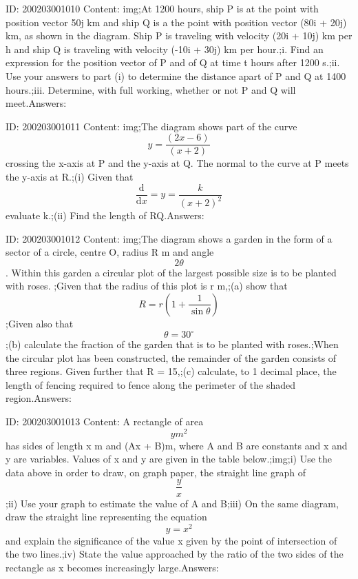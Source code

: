 \documentclass{article}
\begin{document}
ID: 200203001010
Content:
img;At 1200 hours, ship P is at the point with position vector 50j km and ship Q is a the point with position vector (80i + 20j) km, as shown in the diagram. Ship P is traveling with velocity (20i + 10j) km per h and ship Q is traveling with velocity (-10i + 30j) km per hour.;i.	Find an expression for the position vector of P and of Q at time t hours after 1200 s.;ii.	Use your answers to part (i) to determine the distance apart of P and Q at 1400 hours.;iii.	Determine, with full working, whether or not P and Q will meet.Answers:

ID: 200203001011
Content:
img;The diagram shows part of the curve $$ y=\frac{(2x-6)}{(x+2)}$$ crossing the x-axis at P and the y-axis at Q. The normal to the curve at P meets the y-axis at R.;(i)	Given that $$\frac{\mathrm{d} }{\mathrm{d} x}= y=\frac{k}{(x+2)^2}$$ evaluate k.;(ii)	Find the length of RQ.Answers:

ID: 200203001012
Content:
img;The diagram shows a garden in the form of a sector of a circle, centre O, radius R m and angle $$2 \theta$$. Within this garden a circular plot of the largest possible size is to be planted with roses. ;Given that the radius of this plot is r m,;(a)	show that $$R=r(1+ \frac{1}{\sin\theta})$$;Given also that $$\theta = 30^{\circ}$$;(b)	calculate the fraction of the garden that is to be planted with roses.;When the circular plot has been constructed, the remainder of the garden consists of three regions. Given further that R = 15,;(c)	calculate, to 1 decimal place, the length of fencing required to fence along the perimeter of the shaded region.Answers:

ID: 200203001013
Content:
A rectangle of area $$ym^2$$ has sides of length x m and (Ax + B)m, where A and B are constants and x and y are variables. Values of x and y are given in the table below.;img;i) Use the data above in order to draw, on graph paper, the straight line graph of $$\frac{y}{x}$$;ii) Use your graph to estimate the value of A and B;iii) On the same diagram, draw the straight line representing the equation $$y=x^2$$ and explain the significance of the value x given by the point of intersection of the two lines.;iv) State the value approached by the ratio of the two sides of the rectangle as x becomes increasingly large.Answers:
\end{document}
